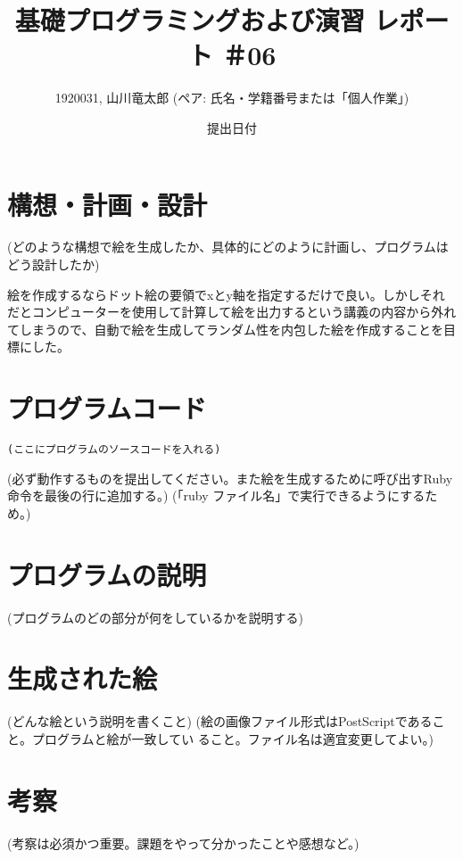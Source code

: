 \documentclass[12pt,a4j]{jarticle}
\begin{document}
\title{基礎プログラミングおよび演習 レポート ＃06}
\author{1920031, 山川竜太郎 (ペア: 氏名・学籍番号または「個人作業」)}
\date{提出日付}
\maketitle

\section{構想・計画・設計}

(どのような構想で絵を生成したか、具体的にどのように計画し、プログラムはどう設計したか)

絵を作成するならドット絵の要領でxとy軸を指定するだけで良い。しかしそれだとコンピューターを使用して計算して絵を出力するという講義の内容から外れてしまうので、自動で絵を生成してランダム性を内包した絵を作成することを目標にした。

\section{プログラムコード}
\begin{verbatim}
(ここにプログラムのソースコードを入れる)
\end{verbatim}
(必ず動作するものを提出してください。また絵を生成するために呼び出すRuby命令を最後の行に追加する。)
(「ruby ファイル名」で実行できるようにするため。)

\section{プログラムの説明}

(プログラムのどの部分が何をしているかを説明する)

\section{生成された絵}

(どんな絵という説明を書くこと)
(絵の画像ファイル形式はPostScriptであること。プログラムと絵が一致してい
ること。ファイル名は適宜変更してよい。)
\begin{center}
\end{center}


\section{考察}

(考察は必須かつ重要。課題をやって分かったことや感想など。)
\end{document}
